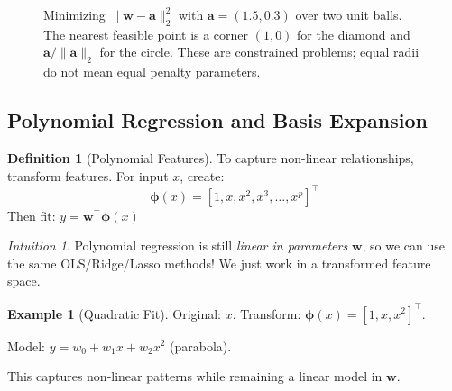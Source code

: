 \documentclass[11pt,twoside]{article}
\numberwithin{equation}{section}
\newcommand{\vect}[1]{\bm{#1}}
\theoremstyle{plain}
\theoremstyle{definition}
\newtheorem{definition}[theorem]{Definition}
\newtheorem{example}[theorem]{Example}
\theoremstyle{remark}
\newtheorem{intuition}[theorem]{Intuition}
\begin{document}
\begin{figure}[H]
\centering
{}
\caption{Minimizing $\|\vect w-\vect a\|_2^2$ with $\vect a=(1.5,0.3)$ over two unit balls. The nearest feasible point is a corner $(1,0)$ for the diamond and $\vect a/\|\vect a\|_2$ for the circle. These are constrained problems; equal radii do not mean equal penalty parameters.}
\end{figure}

\subsection{Polynomial Regression and Basis Expansion}

\begin{definition}[Polynomial Features]
To capture non-linear relationships, transform features. For input $x$, create:
\[
\vect{\phi}(x) = [1, x, x^2, x^3, \ldots, x^p]^\top
\]
Then fit: $y = \vect{w}^\top \vect{\phi}(x)$
\end{definition}

\begin{intuition}
Polynomial regression is still \emph{linear in parameters} $\vect{w}$, so we can use the same OLS/Ridge/Lasso methods! We just work in a transformed feature space.
\end{intuition}

\begin{example}[Quadratic Fit]
Original: $x$. Transform: $\vect{\phi}(x) = [1, x, x^2]^\top$.

Model: $y = w_0 + w_1 x + w_2 x^2$ (parabola).

This captures non-linear patterns while remaining a linear model in $\vect{w}$.
\end{example}
\end{document}
